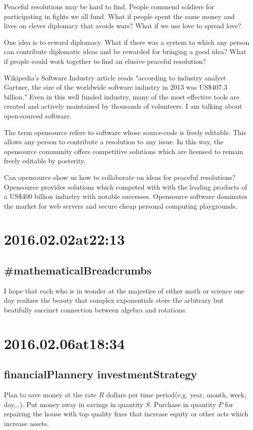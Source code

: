 Peaceful resolutions may be hard to find. People commend soldiers for participating in fights we all fund. What if people spent the same money and lives on clever diplomacy that avoids wars? What if we use love to spread love?

One idea is to reward diplomacy. What if there was a system to which any person can contribute diplomatic ideas and be rewarded for bringing a good idea? What if people could work together to find an elusive peaceful resolution?

Wikipedia's Software Industry article reads "according to industry analyst Gartner, the size of the worldwide software industry in 2013 was US\$407.3 billion." Even in this well funded industry, many of the most effective tools are created and actively maintained by thousands of volunteers. I am talking about open-sourced software.

The term opensource refers to software whose source-code is freely editable. This allows any person to contribute a resolution to any issue. In this way, the opensource community offers competitive solutions which are licensed to remain freely editable by posterity.

Can opensource show us how to collaborate on ideas for peaceful resolutions? Opensource provides solutions which competed with with the leading products of a US\$400 billion industry with notable successes. Opensource software dominates the market for web servers and secure cheap personal computing playgrounds.

\section*{ 2016.02.02at22:13 }
\subsection*{ \#mathematicalBreadcrumbs }
I hope that each who is in wonder at the majesties of either math or science one day realizes the beauty that complex exponentials store the arbitrary but beatifully succinct connection between algebra and rotations.

\section*{ 2016.02.06at18:34 }
\subsection*{ financialPlannery investmentStrategy }
Plan to save money at the rate $R$ dollars per time period(e.g. year, month, week, day,..). Put money away in savings in quantity $S$. Purchase in quantity $P$ for repairing the house with top quality fixes that increase equity or other acts which increase assets.

